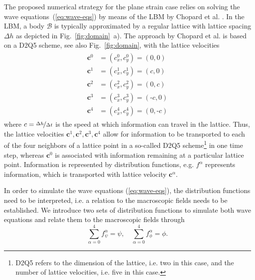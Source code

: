 \documentclass{article}
\renewcommand{\vec}{\boldsymbol}        %
\begin{document}
The proposed numerical strategy for the plane strain case relies on solving the wave equations~(\ref{eq:wave-eqs}) by means of the LBM by Chopard et al. \cite{chopard_lattice_1998}. In the LBM,  a body $\mathcal{B}$ is typically approximated by a regular lattice with lattice spacing $\Delta{h}$ as depicted in Fig.~\ref{fig:domain}~a). The approach by Chopard et al. is based on a D2Q5 scheme, see also Fig.~\ref{fig:domain}, with the lattice velocities 
\begin{gather}
    \begin{aligned}
        \vec{c}^{0} &=({c}^{0}_x,{c}^{0}_y) = (0,0) \\
        \vec{c}^{1} &=({c}^{1}_x,{c}^{1}_y) = (c,0) \\
        \vec{c}^{2} &=({c}^{2}_x,{c}^{2}_y) = (0,c) \\
        \vec{c}^{3} &=({c}^{3}_x,{c}^{3}_y) = (\text{-}c,0) \\
        \vec{c}^{4} &=({c}^{4}_x,{c}^{4}_y) = (0,\text{-}c)
    \end{aligned}
\end{gather}
where $c=\nicefrac{\Delta{h}}{\Delta{t}}$ is the speed at which information can travel in the lattice. Thus, the lattice velocities $\vec{c}^{1}, \vec{c}^{2}, \vec{c}^{3}, \vec{c}^{4}$ allow for information to be transported  to each of the four neighbors of a lattice point in a so-called D2Q5 scheme\footnote{D2Q5 refers to the dimension of the lattice, i.e. two in this case, and the number of lattice velocities, i.e. five in this case.} in one time step, whereas $\vec{c}^{0}$ is associated with information remaining at a particular lattice point. Information is represented by distribution functions, e.g. $f^{\alpha}$ represents information, which is transported with lattice velocity $\vec{c}^\alpha$.

In order to simulate the wave equations (\ref{eq:wave-eqs}), the distribution functions need to be interpreted, i.e. a relation to the macroscopic fields needs to be established.
We introduce two sets of distribution functions to simulate both wave equations and relate them to the macroscopic fields through
\begin{equation}
   \sum_{\alpha=0}^4 f_{\psi}^{\alpha} = \psi, \quad  \sum_{\alpha=0}^4 f_{\phi}^{\alpha} = \phi. 
   \label{eq:interpretation}
\end{equation}
\end{document}
